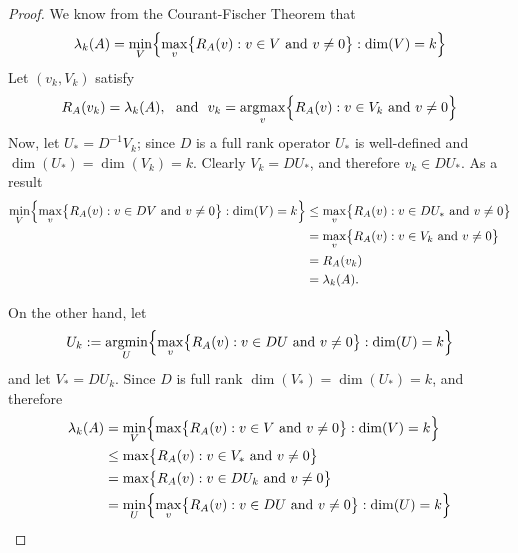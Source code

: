 \documentclass{article}
\newcommand{\1}{\mathbf{1}}
\DeclareMathOperator*{\argmin}{argmin}
\DeclareMathOperator*{\argmax}{argmax}
\theoremstyle{alden}
\theoremstyle{aldenthm}
\theoremstyle{definition}
\theoremstyle{remark}
\begin{document}
\begin{proof}
	We know from the Courant-Fischer Theorem that 
	\begin{equation*}
	\lambda_k(A) = \min_{V}\Bigl\{ \max_{v}\bigl\{R_{A}(v): v \in V~\textrm{and}~v \neq 0\bigr\}: \dim(V) = k \Bigr\}
	\end{equation*}
	Let $(v_k,V_k)$ satisfy
	\begin{equation*}
	R_A(v_k) = \lambda_k(A), ~~\textrm{and}~~ v_k = \argmax_{v} \Bigl\{ R_A(v): v \in V_k~\textrm{and}~v \neq 0 \Bigr\}
	\end{equation*}
	Now, let $U_{\ast} = D^{-1}V_k$; since $D$ is a full rank operator $U_{\ast}$ is well-defined and $\dim(U_{\ast}) = \dim(V_k) = k$. Clearly $V_k = DU_{\ast}$, and therefore $v_k \in DU_{\ast}$. As a result
	\begin{align*}
	\min_{V}\Bigl\{ \max_{v}\bigl\{R_{A}(v): v \in DV~\textrm{and}~v \neq 0\bigr\}: \dim(V) = k \Bigr\} & \leq \max_{v}\bigl\{R_{A}(v): v \in DU_{\ast}~\textrm{and}~v \neq 0\bigr\} \\
	& = \max_{v}\bigl\{R_{A}(v): v \in V_k~\textrm{and}~v \neq 0\bigr\} \\
	& = R_A(v_k) \\
	& = \lambda_k(A).
	\end{align*}
	
	On the other hand, let
	\begin{equation*}
	U_k := \argmin_U \Bigl\{\max_{v} \bigl\{R_A(v): v \in DU~\textrm{and}~ v \neq 0\bigr\}: \dim(U) = k\Bigr\}
	\end{equation*}
	and let $V_{\ast} = DU_{k}$. Since $D$ is full rank $\dim(V_{\ast}) = \dim(U_{\ast}) = k$, and therefore
	\begin{align*}
	\lambda_k(A) & = \min_{V} \Bigl\{\max\bigl\{R_A(v): v \in V~\textrm{and}~ v \neq 0 \bigr\}: \dim(V) = k\Bigr\} \\
	& \leq \max\bigl\{R_A(v): v \in V_{\ast}~\textrm{and}~v \neq 0 \bigr\} \\
	& = \max\bigl\{R_A(v): v \in DU_{k}~\textrm{and}~v \neq 0 \bigr\} \\
	& = \min_U \Bigl\{\max_{v} \bigl\{R_A(v): v \in DU~\textrm{and}~v \neq 0\bigr\}: \dim(U) = k\Bigr\}
	\end{align*}
\end{proof}
\end{document}
